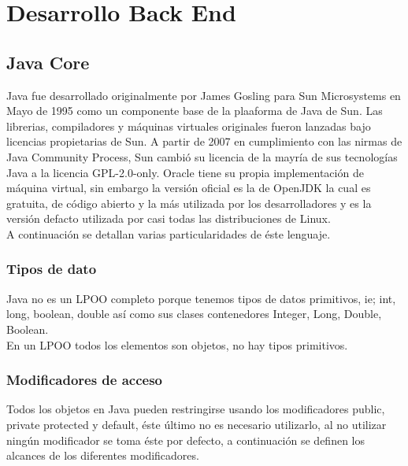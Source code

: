 \documentclass[12pt,article,oneside]{memoir}
\begin{document}
\part{  Desarrollo Back End}
	\chapter{Java Core}	
	Java fue desarrollado originalmente por James Gosling para Sun Microsystems en Mayo de 1995 como un componente base de la 
	plaaforma de Java de Sun. Las librerias, compiladores y m\'aquinas virtuales originales fueron lanzadas bajo licencias 
	propietarias de Sun. A partir de 2007 en cumplimiento con las nirmas de Java Community Process, Sun cambi\'o su licencia 
	de la mayr\'ia de sus tecnolog\'ias Java a la licencia GPL-2.0-only. Oracle tiene su propia implementaci\'on de m\'aquina 
	virtual, sin embargo la versi\'on oficial es la de OpenJDK la cual es gratuita, de c\'odigo abierto y la m\'as utilizada 
	por los desarrolladores y es la versi\'on defacto utilizada por casi todas las distribuciones de Linux.\\
	
	A continuaci\'on se detallan varias particularidades de \'este lenguaje.
	
		\section{Tipos de dato}
		Java no es un LPOO completo porque tenemos tipos de datos primitivos, ie; int, long, boolean, double as\'i como sus 
		clases contenedores Integer, Long, Double, Boolean. \\
		
		En un LPOO todos los elementos son objetos, no hay tipos primitivos.
		
		\section{Modificadores de acceso}
		Todos los objetos en Java pueden restringirse usando los modificadores public, private protected y default, \'este 
		\'ultimo no es necesario utilizarlo, al no utilizar ning\'un modificador se toma \'este por defecto, a continuaci\'on 
		se definen los alcances de los diferentes modificadores.
		
\end{document}
